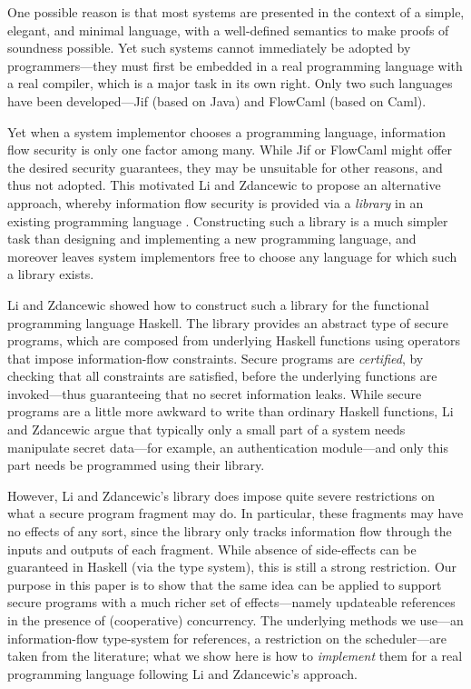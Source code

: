 \documentclass[times, 10pt,twocolumn]{article}
\begin{document}
One possible reason is that most systems are presented in the context
of a simple, elegant, and minimal language, with a well-defined
semantics to make proofs of soundness possible. Yet such systems
cannot immediately be adopted by programmers---they must first be
embedded in a real programming language with a real compiler, which is
a major task in its own right. Only two such languages have been
developed---Jif \cite{Myers:POPL99,jif} (based on Java) and FlowCaml
\cite{Pottier:Simonet:POPL02,simonet03flow} (based on Caml).

Yet when a system implementor chooses a programming language,
information flow security is only one factor among many. While Jif or
FlowCaml might offer the desired security guarantees, they may be
unsuitable for other reasons, and thus not adopted. This motivated Li
and Zdancewic to propose an alternative approach, whereby information
flow security is provided via a {\em library} in an existing
programming language \cite{LiZdancewic:CSFW06}. Constructing such a library
is a much simpler task than designing and implementing a new
programming language, and moreover leaves system implementors free to
choose any language for which such a library exists.

Li and Zdancewic showed how to construct such a library for the
functional programming language Haskell. The library provides an
abstract type of secure programs, which are composed from underlying
Haskell functions using operators that impose information-flow
constraints. Secure programs are {\em certified}, by checking that all
constraints are satisfied, before the underlying functions are
invoked---thus guaranteeing that no secret information leaks. While
secure programs are a little more awkward to write than ordinary
Haskell functions, Li and Zdancewic argue that typically only a small
part of a system needs manipulate secret data---for example, an
authentication module---and only this part needs be programmed using
their library.

However, Li and Zdancewic's library does impose quite severe
restrictions on what a secure program fragment may do. In particular,
these fragments may have no effects of any sort, since the library
only tracks information flow through the inputs and outputs of each
fragment. While absence of side-effects can be guaranteed in Haskell
(via the type system), this is still a strong restriction. Our purpose
in this paper is to show that the same idea can be applied to support
secure programs with a much richer set of effects---namely updateable
references in the presence of (cooperative) concurrency. The
underlying methods we use---an information-flow type-system for
references, a restriction on the scheduler---are taken from the
literature; what we show here is how to {\em implement} them for a
real programming language following Li and Zdancewic's approach.
\end{document}

